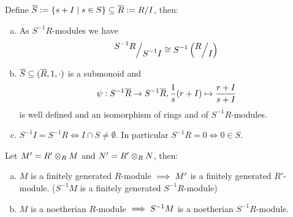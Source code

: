 \documentclass[a4paper]{report}
\begin{document}
\begin{prop}
  Define $\bar S:= \{s + I \mid s \in S\} \subseteq \bar R := \fak RI$, then:
  \begin{enumerate}[(a)]
    \item As $S^{-1}R$-modules we have \[\fak{S^{-1}R}{S^{-1}I} \cong S^{-1} \l(\fak RI\r)\]
    \item $\overline S \subseteq (\overline R, 1, \cdot)$ is a submonoid and \[\psi: S^{-1}\overline R \to S^{-1} \overline R, \frac 1s(r+I) \mapsto \frac {r+I}{s+I}\]
          is well defined and an isomorphism of rings and of $S^{-1}R$-modules.
          \item $S^{-1}I = S^{-1}R \iff I \cap S \ne \emptyset$. In particular $S^{-1}R =0 \iff 0 \in S$.
  \end{enumerate}

\end{prop}
\begin{prop}
Let $M' = R' \otimes_{R} M$ and $N' = R' \otimes_{R} N$, then:
\begin{enumerate}[(a)]
  \item $M$ is a finitely generated $R$-module $\implies M'$ is a finitely generated $R'$-module. ($S^{-1}M$ is a finitely generated $S^{-1}R$-module)
 \item $M$ is a noetherian $R$-module $\implies S^{-1}M$  is a noetherian $S^{-1}R$-module.
\end{enumerate}
\end{prop}
\end{document}
